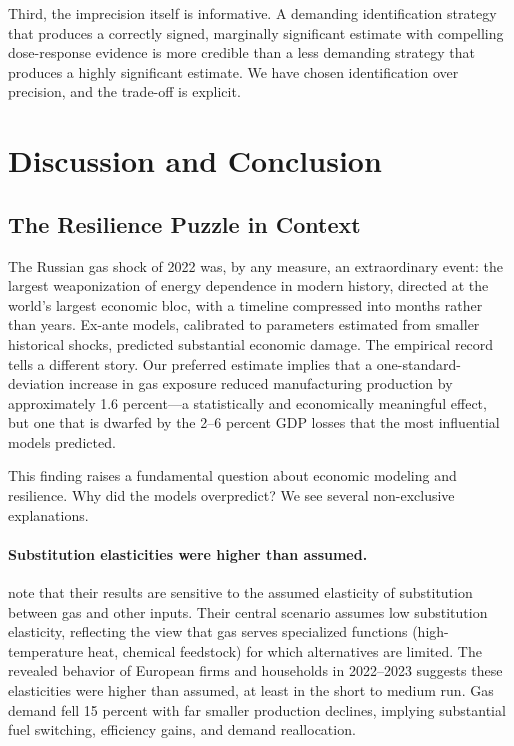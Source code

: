 \documentclass[12pt]{article}
\begin{document}
Third, the imprecision itself is informative. A demanding identification strategy that produces a correctly signed, marginally significant estimate with compelling dose-response evidence is more credible than a less demanding strategy that produces a highly significant estimate. We have chosen identification over precision, and the trade-off is explicit.


\section{Discussion and Conclusion}
\label{sec:conclusion}

\subsection{The Resilience Puzzle in Context}

The Russian gas shock of 2022 was, by any measure, an extraordinary event: the largest weaponization of energy dependence in modern history, directed at the world's largest economic bloc, with a timeline compressed into months rather than years. Ex-ante models, calibrated to parameters estimated from smaller historical shocks, predicted substantial economic damage. The empirical record tells a different story. Our preferred estimate implies that a one-standard-deviation increase in gas exposure reduced manufacturing production by approximately 1.6 percent---a statistically and economically meaningful effect, but one that is dwarfed by the 2--6 percent GDP losses that the most influential models predicted.

This finding raises a fundamental question about economic modeling and resilience. Why did the models overpredict? We see several non-exclusive explanations.

\paragraph{Substitution elasticities were higher than assumed.} \citet{bachmann2022} note that their results are sensitive to the assumed elasticity of substitution between gas and other inputs. Their central scenario assumes low substitution elasticity, reflecting the view that gas serves specialized functions (high-temperature heat, chemical feedstock) for which alternatives are limited. The revealed behavior of European firms and households in 2022--2023 suggests these elasticities were higher than assumed, at least in the short to medium run. Gas demand fell 15 percent with far smaller production declines, implying substantial fuel switching, efficiency gains, and demand reallocation.
\end{document}
